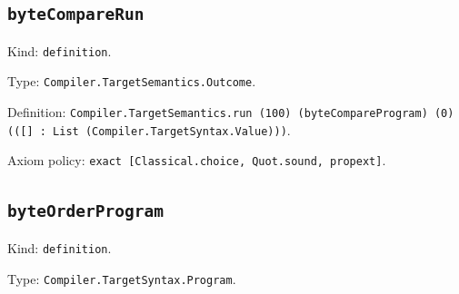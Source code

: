 \documentclass[11pt]{article}
\begin{document}
\subsection*{\texttt{byteCompareRun}}
\noindent Kind: \texttt{definition}.\par
\noindent Type: \texttt{Compiler.TargetSemantics.Outcome}.\par
\noindent Definition: \texttt{Compiler.TargetSemantics.run (100) (byteCompareProgram) (0) (([] : List (Compiler.TargetSyntax.Value)))}.\par
\noindent Axiom policy: \texttt{exact [Classical.choice, Quot.sound, propext]}.\par
\subsection*{\texttt{byteOrderProgram}}
\noindent Kind: \texttt{definition}.\par
\noindent Type: \texttt{Compiler.TargetSyntax.Program}.\par
\end{document}

